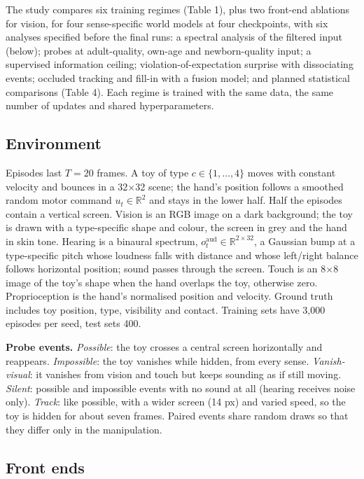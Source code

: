 \documentclass{article}
\begin{document}
The study compares six training regimes (Table 1), plus two front-end ablations for vision, for four sense-specific world models at four checkpoints, with six analyses specified before the final runs: a spectral analysis of the filtered input (below); probes at adult-quality, own-age and newborn-quality input; a supervised information ceiling; violation-of-expectation surprise with dissociating events; occluded tracking and fill-in with a fusion model; and planned statistical comparisons (Table 4). Each regime is trained with the same data, the same number of updates and shared hyperparameters.

\hypertarget{environment}{%
\subsection{Environment}\label{environment}}

Episodes last \(T=20\) frames. A toy of type \(c\in\{1,\dots,4\}\) moves with constant velocity and bounces in a 32\ensuremath{\times}32 scene; the hand's position follows a smoothed random motor command \(u_t\in\mathbb R^2\) and stays in the lower half. Half the episodes contain a vertical screen. Vision is an RGB image on a dark background; the toy is drawn with a type-specific shape and colour, the screen in grey and the hand in skin tone. Hearing is a binaural spectrum, \(o^{\text{aud}}_t\in\mathbb R^{2\times32}\), a Gaussian bump at a type-specific pitch whose loudness falls with distance and whose left/right balance follows horizontal position; sound passes through the screen. Touch is an 8\ensuremath{\times}8 image of the toy's shape when the hand overlaps the toy, otherwise zero. Proprioception is the hand's normalised position and velocity. Ground truth includes toy position, type, visibility and contact. Training sets have 3,000 episodes per seed, test sets 400.

\textbf{Probe events.} \emph{Possible}: the toy crosses a central screen horizontally and reappears. \emph{Impossible}: the toy vanishes while hidden, from every sense. \emph{Vanish-visual}: it vanishes from vision and touch but keeps sounding as if still moving. \emph{Silent}: possible and impossible events with no sound at all (hearing receives noise only). \emph{Track}: like possible, with a wider screen (14 px) and varied speed, so the toy is hidden for about seven frames. Paired events share random draws so that they differ only in the manipulation.

\hypertarget{front-ends}{%
\subsection{Front ends}\label{front-ends}}
\end{document}
